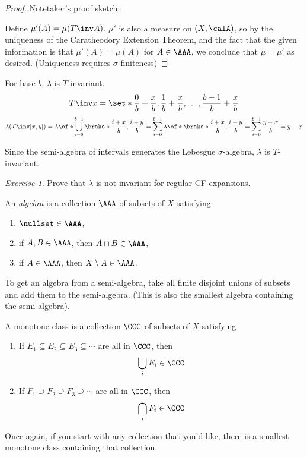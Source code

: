 \documentclass{article}
\theoremstyle{remark}
\newtheorem{exercise}{Exercise}
\begin{document}
\begin{proof}
    Notetaker's proof sketch:

    Define $\mu'(A) = \mu(T\inv A)$. $\mu'$ is also a measure
    on $(X,\calA)$, so by the uniqueness of the Caratheodory
    Extension Theorem, and the fact that the given information
    is that $\mu'(A)=\mu(A)$ for $A\in\AAA$, we conclude 
    that $\mu=\mu'$ as desired.
    (Uniqueness requires $\sigma$-finiteness)
\end{proof}

\begin{example}
    For base $b$, $\lambda$ is $T$-invariant.
    \[ T\inv x = \set*{\frac{0}{b} + \frac{x}{b},
    \frac{1}{b} + \frac{x}{b}, \ldots, 
    \frac{b-1}{b} + \frac{x}{b}}\]
    \[ \lambda(T\inv [x,y]) = 
    \lambda \of*{\bigcup_{i=0}^{b-1} \braks*{\frac{i+x}{b}, \frac{i+y}{b}}
    }
    = \sum_{i=0}^{b-1} \lambda\of*{\braks*{\frac{i+x}{b},\frac{i+y}{b}}}
    = \sum_{i=0}^{b-1} \frac{y-x}{b} = y-x
    \]

    Since the semi-algebra of intervals generates the 
    Lebesgue $\sigma$-algebra, $\lambda$ is $T$-invariant.
\end{example}

\begin{exercise}
    Prove that $\lambda$ is not invariant for regular
    CF expansions.
\end{exercise}

\begin{definition}
    An \emph{algebra} is a collection $\AAA$ of subsets of $X$ satisfying
    \begin{enumerate}
        \item $\nullset \in \AAA$,
        \item if $A,B \in \AAA$, then $A\cap B\in \AAA$,
        \item if $A\in \AAA$, then $X\setminus A \in \AAA$.
    \end{enumerate}
\end{definition}

To get an algebra from a semi-algebra, take all finite disjoint unions of subsets
and add them to the semi-algebra. (This is also the smallest
algebra containing the semi-algebra).

\begin{definition}
    A monotone class is a collection $\CCC$ of subsets of $X$ 
    satisfying
    \begin{enumerate}
        \item If $E_1\subseteq E_2 \subseteq E_3\subseteq \cdots $
            are all in $\CCC$, then 
            \[ \bigcup_{i} E_i \in\CCC \]
        \item If $F_1\supseteq F_2\supseteq F_3 \supseteq \cdots $
            are all in $\CCC$, then 
            \[ \bigcap_i F_i \in \CCC \]
    \end{enumerate}

    Once again, if you start with any collection that you'd like,
    there is a smallest monotone class containing that collection.
\end{definition}
\end{document}
